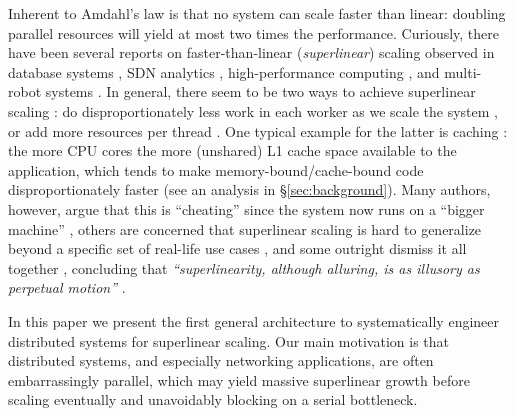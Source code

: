 Inherent to Amdahl's law is that no system can scale faster than linear: doubling parallel resources will yield at most two times the performance. Curiously, there have been several reports on faster-than-linear (\emph{superlinear}) scaling observed in database systems \cite{scalability-analyzed, 10.5555/1012889.1012894}, SDN analytics \cite{sdn-analytitcs}, high-performance computing \cite{556383, 7733347, 6483679}, and multi-robot systems \cite{10.1007/978-3-319-77610-1}. In general, there seem to be two ways to achieve superlinear scaling \cite{7733347, 80148}: do disproportionately less work in each worker as we scale the system \cite{7733347}, or add more resources per thread \cite{80148}. One typical example for the latter is caching \cite{271208, 10.5555/1012889.1012894}: the more CPU cores the more (unshared) L1 cache space available to the application, which tends to make memory-bound\slash cache-bound code disproportionately faster \cite{80148} (see an analysis in \S\ref{sec:background}).  Many authors, however, argue that this is ``cheating'' \cite{gunther-hotsos, 10.1145/2773212.2789974} since the system now runs on a ``bigger machine'' \cite{80148}, others are concerned that superlinear scaling is hard to generalize beyond a specific set of real-life use cases \cite{7733347, 80148}, and some outright dismiss it all together \cite{gunther-hotsos, 10.1016/0167-8191(86)90024-4}, concluding that \emph{``superlinearity, although alluring, is as illusory as perpetual motion''} \cite{10.1145/2773212.2789974}.

In this paper we present the first general architecture to systematically engineer distributed systems for superlinear scaling. Our main motivation is that distributed systems, and especially networking applications, are often embarrassingly parallel, %
which may yield massive superlinear growth before scaling eventually and unavoidably blocking on a serial bottleneck.

